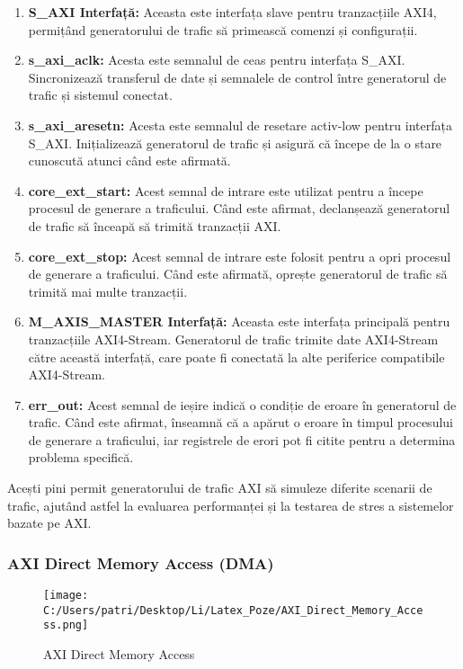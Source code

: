 \documentclass[12pt]{article}
\begin{document}
\begin{enumerate}
    \item \textbf{S\_AXI Interfață:} Aceasta este interfața slave pentru tranzacțiile AXI4, permițând generatorului de trafic să primească comenzi și configurații.
    \item \textbf{s\_axi\_aclk:} Acesta este semnalul de ceas pentru interfața S\_AXI. Sincronizează transferul de date și semnalele de control între generatorul de trafic și sistemul conectat.
    \item \textbf{s\_axi\_aresetn:} Acesta este semnalul de resetare activ-low pentru interfața S\_AXI. Inițializează generatorul de trafic și asigură că începe de la o stare cunoscută atunci când este afirmată.
    \item \textbf{core\_ext\_start:} Acest semnal de intrare este utilizat pentru a începe procesul de generare a traficului. Când este afirmat, declanșează generatorul de trafic să înceapă să trimită tranzacții AXI.
    \item \textbf{core\_ext\_stop:} Acest semnal de intrare este folosit pentru a opri procesul de generare a traficului. Când este afirmată, oprește generatorul de trafic să trimită mai multe tranzacții.
    \item \textbf{M\_AXIS\_MASTER Interfață:} Aceasta este interfața principală pentru tranzacțiile AXI4-Stream. Generatorul de trafic trimite date AXI4-Stream către această interfață, care poate fi conectată la alte periferice compatibile AXI4-Stream.
    \item \textbf{err\_out:} Acest semnal de ieșire indică o condiție de eroare în generatorul de trafic. Când este afirmat, înseamnă că a apărut o eroare în timpul procesului de generare a traficului, iar registrele de erori pot fi citite pentru a determina problema specifică.\\
\end{enumerate}
\hspace*{1cm}Acești pini permit generatorului de trafic AXI să simuleze diferite scenarii de trafic, ajutând astfel la evaluarea performanței și la testarea de stres a sistemelor bazate pe AXI.



\subsubsection{AXI Direct Memory Access (DMA)} 

\begin{figure}[H]
    \centering
    \texttt{[image: C:/Users/patri/Desktop/Li/Latex\_Poze/AXI\_Direct\_Memory\_Access.png]}
    \caption{AXI Direct Memory Access}
\end{figure}
\end{document}
